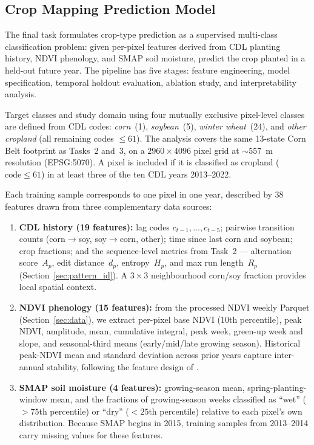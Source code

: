 \documentclass{article}
\begin{document}
\subsection{Crop Mapping Prediction Model}
\label{sec:mapping_pred}

The final task formulates crop-type prediction as a supervised multi-class
classification problem: given per-pixel features derived from CDL planting
history, NDVI phenology, and SMAP soil moisture, predict the crop planted in
a held-out future year.  The pipeline has five stages: feature engineering,
model specification, temporal holdout evaluation, ablation study, and
interpretability analysis.

Target classes and study domain using four mutually exclusive pixel-level classes are defined from CDL codes:
\emph{corn}~(1), \emph{soybean}~(5), \emph{winter wheat}~(24), and
\emph{other cropland} (all remaining codes $\leq 61$).
The analysis covers the same 13-state Corn Belt footprint as Tasks~2
and~3, on a $2960 \times 4096$ pixel grid at ${\sim}557$~m resolution
(EPSG:5070).
A pixel is included if it is classified as cropland ($\text{code} \leq 61$)
in at least three of the ten CDL years 2013--2022.

Each training sample corresponds to one pixel in one year, described by 38
features drawn from three complementary data sources:

\begin{enumerate}[label=(\roman*)]
    \item \textbf{CDL history (19 features):} lag codes
          $c_{t-1},\ldots,c_{t-5}$; pairwise transition counts
          (corn$\to$soy, soy$\to$corn, other); time since last corn and
          soybean; crop fractions; and the sequence-level metrics from
          Task~2 --- alternation score~$A_p$, edit distance~$d_p$,
          entropy~$H_p$, and max run length~$R_p$
          (Section~\ref{sec:pattern_id}).
          A $3{\times}3$ neighbourhood corn/soy fraction provides local
          spatial context.

    \item \textbf{NDVI phenology (15 features):} from the processed NDVI
          weekly Parquet (Section~\ref{sec:data}), we extract per-pixel
          base NDVI (10th percentile), peak NDVI, amplitude, mean,
          cumulative integral, peak week, green-up week and slope, and
          seasonal-third means (early/mid/late growing season).
          Historical peak-NDVI mean and standard deviation across prior
          years capture inter-annual stability, following the feature
          design of \citet{cai2018crop}.

    \item \textbf{SMAP soil moisture (4 features):} growing-season mean,
          spring-planting-window mean, and the fractions of growing-season
          weeks classified as ``wet'' ($> 75$th percentile) or ``dry''
          ($< 25$th percentile) relative to each pixel's own distribution.
          Because SMAP begins in 2015, training samples from 2013--2014
          carry missing values for these features.
\end{enumerate}
\end{document}
